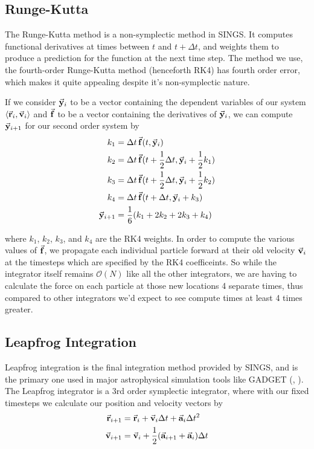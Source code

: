\documentclass[12pt, twoside, letterpaper]{article}
\begin{document}
\subsection{Runge-Kutta} \label{subsec:rk4}
The Runge-Kutta method is a non-symplectic method in SINGS. It computes functional derivatives at times between $t$ and $t + \Delta t$, and weights them to produce a prediction for the function at the next time step. The method we use, the fourth-order Runge-Kutta method (henceforth RK4) has fourth order error, which makes it quite appealing despite it's non-symplectic nature.

If we consider $\va{y}_i$ to be a vector containing the dependent variables of our system $\langle \va{r}_i, \va{v}_i \rangle$ and $\va{f}$ to be a vector containing the derivatives of $\va{y}_i$, we can compute $\va{y}_{i+1}$ for our second order system by 
\begin{subequations} \label{eq:rk4}
	\begin{align}
		k_1 & = \Delta t \, \va{f}(t, \va{y}_i)\\
		k_2 & = \Delta t \, \va{f}(t + \frac{1}{2} \Delta t, \va{y}_i + \frac{1}{2} k_1) \\
		k_3 & = \Delta t \, \va{f}(t + \frac{1}{2} \Delta t, \va{y}_i + \frac{1}{2} k_2) \\
		k_4 & = \Delta t \, \va{f}(t + \Delta t, \va{y}_i + k_3) \\
		\va{y}_{i+1} & = \frac{1}{6}(k_1 + 2k_2 + 2k_3 + k_4)
	\end{align}
\end{subequations}

\noindent where $k_1$, $k_2$, $k_3$, and $k_4$ are the RK4 weights. In order to compute the various values of $\va{f}$, we propagate each individual particle forward at their old velocity $\va{v}_i$ at the timesteps which are specified by the RK4 coefficeints. So while the integrator itself remains $\mathcal{O}(N)$ like all the other integrators, we are having to calculate the force on each particle at those new locations 4 separate times, thus compared to other integrators we'd expect to see compute times at least 4 times greater.

\subsection{Leapfrog Integration} \label{subsec:leapfrog}
Leapfrog integration is the final integration method provided by SINGS, and is the primary one used in major astrophysical simulation tools like GADGET (\citet{springel2005simulating}, \citet{springel2021simulating}). The Leapfrog integrator is a 3rd order symplectic integrator, where with our fixed timesteps we calculate our position and velocity vectors by
\begin{subequations} \label{eq:leapfrog}
	\begin{align}
		\va{r}_{i+1} & = \va{r}_i + \va{v}_i \Delta t + \va{a}_i \Delta t^2 \\
		\va{v}_{i+1} & = \va{v}_i + \frac{1}{2}(\va{a}_{i+1} + \va{a}_i) \Delta t
	\end{align}		
\end{subequations}
\end{document}
